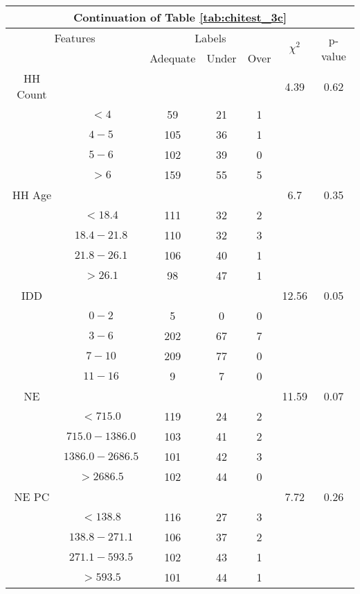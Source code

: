 \begin{table}
\centering
\label{tab:chitest_3c_cont}
\begin{tabular}{c c | c c c| c | c}
\hline
\multicolumn{7}{c}{Continuation of Table \ref{tab:chitest_3c}}\\ 
\hline
\multicolumn{2}{c|}{Features}& \multicolumn{3}{c|}{Labels}& \multirow{2}{*}{$\chi^2$} & \multirow{2}{*}{p-value}\\ 
& & Adequate & Under & Over & & \\ 
\hline
HH Count &  &  &  & & 4.39 & 0.62 \\ 
& $< 4$ & 59 & 21 & 1& & \\ 
& $4-5$ & 105 & 36 & 1& & \\ 
& $5-6$ & 102 & 39 & 0& & \\ 
& $> 6$ & 159 & 55 & 5& & \\ 
\hline 
HH Age &  &  &  & & 6.7 & 0.35 \\ 
& $< 18.4$ & 111 & 32 & 2& & \\ 
& $18.4-21.8$ & 110 & 32 & 3& & \\ 
& $21.8-26.1$ & 106 & 40 & 1& & \\ 
& $> 26.1$ & 98 & 47 & 1& & \\ 
\hline 
IDD &  &  &  & & 12.56 & 0.05 \\ 
& $0-2$ & 5 & 0 & 0& & \\ 
& $3-6$ & 202 & 67 & 7& & \\ 
& $7-10$ & 209 & 77 & 0& & \\ 
& $11-16$ & 9 & 7 & 0& & \\ 
\hline 
NE &  &  &  & & 11.59 & 0.07 \\ 
& $< 715.0$ & 119 & 24 & 2& & \\ 
& $715.0-1386.0$ & 103 & 41 & 2& & \\ 
& $1386.0-2686.5$ & 101 & 42 & 3& & \\ 
& $> 2686.5$ & 102 & 44 & 0& & \\ 
\hline 
NE PC &  &  &  & & 7.72 & 0.26 \\ 
& $< 138.8$ & 116 & 27 & 3& & \\ 
& $138.8-271.1$ & 106 & 37 & 2& & \\ 
& $271.1-593.5$ & 102 & 43 & 1& & \\ 
& $> 593.5$ & 101 & 44 & 1& & \\ 
\hline 
\end{tabular}
\end{table}

